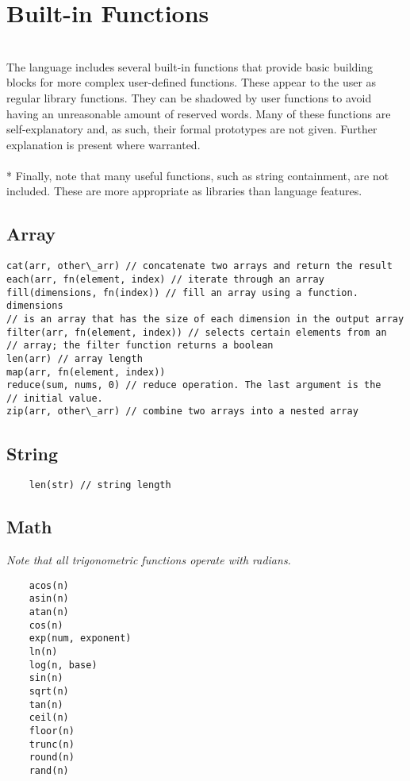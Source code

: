 \documentclass[11pt]{article}
\begin{document}
\section{Built-in Functions}
\\ The language includes several built-in functions that provide basic building blocks for more complex user-defined functions. These appear to the user as regular library functions. They can be shadowed by user functions to avoid having an unreasonable amount of reserved words. Many of these functions are self-explanatory and, as such, their formal prototypes are not given.  Further explanation is present where warranted.
\\ \\* Finally, note that many useful functions, such as string containment, are not included. These are more appropriate as libraries than language features.

\subsection{Array}
\begin{verbatim}
cat(arr, other\_arr) // concatenate two arrays and return the result
each(arr, fn(element, index) // iterate through an array
fill(dimensions, fn(index)) // fill an array using a function. dimensions
// is an array that has the size of each dimension in the output array
filter(arr, fn(element, index)) // selects certain elements from an 
// array; the filter function returns a boolean
len(arr) // array length
map(arr, fn(element, index))
reduce(sum, nums, 0) // reduce operation. The last argument is the 
// initial value.
zip(arr, other\_arr) // combine two arrays into a nested array
\end{verbatim}

\subsection{String}
\begin{verbatim}
    len(str) // string length
\end{verbatim}

\subsection{Math}
\emph{Note that all trigonometric functions operate with radians.}
\begin{verbatim}
    acos(n)
    asin(n)
    atan(n)
    cos(n)
    exp(num, exponent)
    ln(n)
    log(n, base)
    sin(n)
    sqrt(n)
    tan(n)
    ceil(n)
    floor(n)
    trunc(n)
    round(n)
    rand(n)
\end{verbatim}
\end{document}
